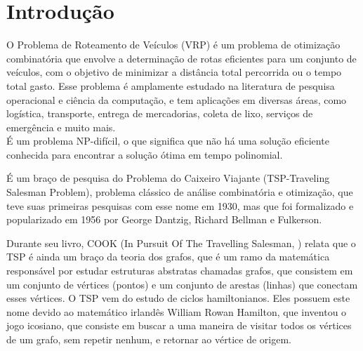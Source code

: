 \documentclass[
    openany,
    12pt,
    a4paper,
    twoside,
    english,
    brazil, sumario=tradicional
]{/home/lucas_galdino/Desktop/TCC/planning/abntex2/abntex2}
\renewcommand{\cleardoublepage}{}
\let\oldchapter\chapter
\renewcommand{\chapter}{\clearpage\oldchapter}
\begin{document}

\imprimircapa

\imprimirfolhaderosto*

\tableofcontents
\cleardoublepage

\cleardoublepage
\textual



\chapter{Introdução}

O Problema de Roteamento de Veículos (VRP) é um problema de otimização combinatória que envolve a determinação de rotas eficientes para um conjunto de veículos, 
com o objetivo de minimizar a distância total percorrida ou o tempo total gasto. 
Esse problema é amplamente estudado na literatura de pesquisa operacional e ciência da computação, 
e tem aplicações em diversas áreas, como logística, transporte, entrega de mercadorias, coleta de lixo, serviços de emergência e muito mais.\\

É um problema NP-difícil, 
o que significa que não há uma solução eficiente conhecida para encontrar a solução ótima em tempo polinomial. 

É um braço de pesquisa do Problema do Caixeiro Viajante (TSP-Traveling Salesman Problem), problema clássico de análise combinatória 
e otimização, que teve suas primeiras pesquisas com esse nome em 1930, mas que foi formalizado e popularizado em 1956 por George Dantzig, 
Richard Bellman e Fulkerson. 

Durante seu livro, COOK (In Pursuit Of The Travelling Salesman, \citeyear{pursuit_travelling_salesman}) relata que o TSP é ainda um braço da teoria dos grafos,
 que é um ramo da matemática responsável por estudar estruturas 
abstratas chamadas grafos, que consistem em um conjunto de vértices (pontos) e um conjunto de arestas (linhas) que conectam esses vértices. O TSP vem do 
estudo de ciclos hamiltonianos. Eles possuem este nome devido ao matemático irlandês William Rowan Hamilton, que inventou o jogo icosiano, que consiste em buscar 
a uma maneira de visitar todos os vértices de um grafo, sem repetir nenhum, e retornar ao vértice de origem.
\end{document}
